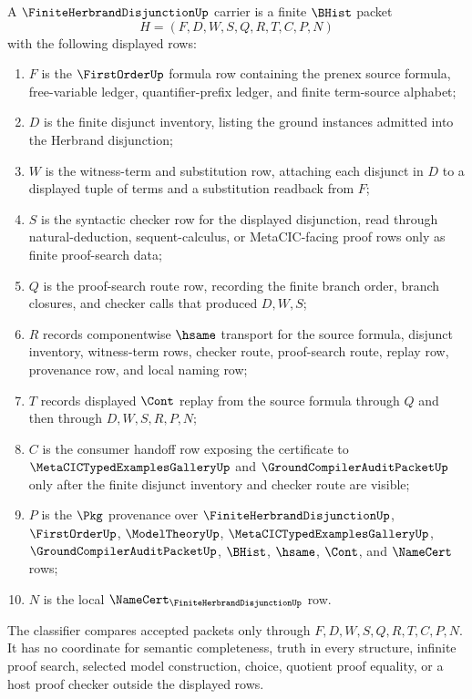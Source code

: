 \begin{definition}
\label{def:finite-herbrand-disjunction-carrier}
A $\FiniteHerbrandDisjunctionUp$ carrier is a finite $\BHist$ packet
$$
H=(F,D,W,S,Q,R,T,C,P,N)
$$
with the following displayed rows:
\begin{enumerate}
\item $F$ is the $\FirstOrderUp$ formula row containing the prenex source formula, free-variable ledger, quantifier-prefix ledger, and finite term-source alphabet;
\item $D$ is the finite disjunct inventory, listing the ground instances admitted into the Herbrand disjunction;
\item $W$ is the witness-term and substitution row, attaching each disjunct in $D$ to a displayed tuple of terms and a substitution readback from $F$;
\item $S$ is the syntactic checker row for the displayed disjunction, read through natural-deduction, sequent-calculus, or MetaCIC-facing proof rows only as finite proof-search data;
\item $Q$ is the proof-search route row, recording the finite branch order, branch closures, and checker calls that produced $D,W,S$;
\item $R$ records componentwise $\hsame$ transport for the source formula, disjunct inventory, witness-term rows, checker route, proof-search route, replay row, provenance row, and local naming row;
\item $T$ records displayed $\Cont$ replay from the source formula through $Q$ and then through $D,W,S,R,P,N$;
\item $C$ is the consumer handoff row exposing the certificate to $\MetaCICTypedExamplesGalleryUp$ and $\GroundCompilerAuditPacketUp$ only after the finite disjunct inventory and checker route are visible;
\item $P$ is the $\Pkg$ provenance over $\FiniteHerbrandDisjunctionUp$, $\FirstOrderUp$, $\ModelTheoryUp$, $\MetaCICTypedExamplesGalleryUp$, $\GroundCompilerAuditPacketUp$, $\BHist$, $\hsame$, $\Cont$, and $\NameCert$ rows;
\item $N$ is the local $\NameCert_{\FiniteHerbrandDisjunctionUp}$ row.
\end{enumerate}
The classifier compares accepted packets only through $F,D,W,S,Q,R,T,C,P,N$. It has no coordinate for semantic completeness, truth in every structure, infinite proof search, selected model construction, choice, quotient proof equality, or a host proof checker outside the displayed rows.
\end{definition}

